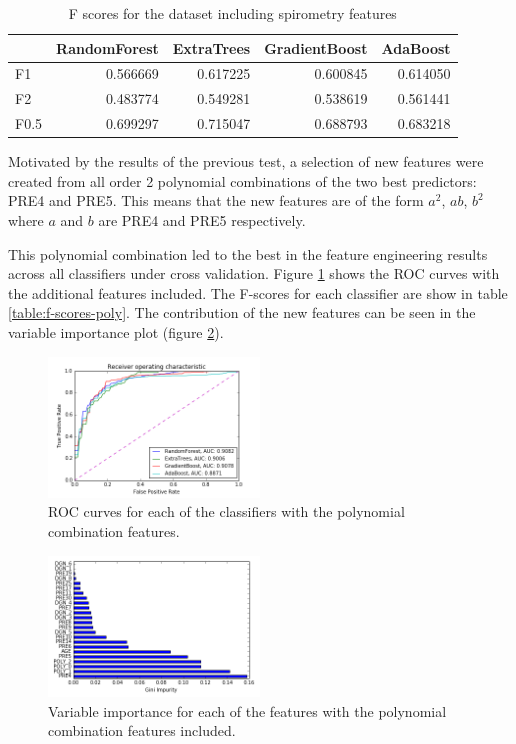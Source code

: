 \documentclass[journal]{IEEEtran}
\begin{document}
\begin{table}
\caption{F scores for the dataset including spirometry features}
\begin{tabular}{lrrrr}
{} &  RandomForest &  ExtraTrees &  GradientBoost &  AdaBoost \\
\hline
F1   &      0.566669 &    0.617225 &       0.600845 &  0.614050 \\
F2   &      0.483774 &    0.549281 &       0.538619 &  0.561441 \\
F0.5 &      0.699297 &    0.715047 &       0.688793 &  0.683218 \\
\end{tabular}
\end{table}

Motivated by the results of the previous test, a selection of new features were created from all order 2 polynomial combinations of the two best predictors: PRE4 and PRE5. This means that the new features are of the form $a^2$, $ab$, $b^2$ where $a$ and $b$ are PRE4 and PRE5 respectively. 

This polynomial combination led to the best in the feature engineering results across all classifiers under cross validation. Figure \ref{fig:roc-poly-features} shows the ROC curves with the additional features included. The F-scores for each classifier are show in table \ref{table:f-scores-poly}. The contribution of the new features can be seen in the variable importance plot (figure \ref{fig:importance-poly-features}).

\begin{figure}[!t]
\centering
\includegraphics[width=0.5\textwidth]{../src/img/roc_poly_features.png}
\caption{ROC curves for each of the classifiers with the polynomial combination features.}
\label{fig:roc-poly-features}
\end{figure}

\begin{figure}[!t]
\centering
\includegraphics[width=0.5\textwidth]{../src/img/importance_poly_features.png}
\caption{Variable importance for each of the features with the polynomial combination features included.}
\label{fig:importance-poly-features}
\end{figure}
\end{document}

